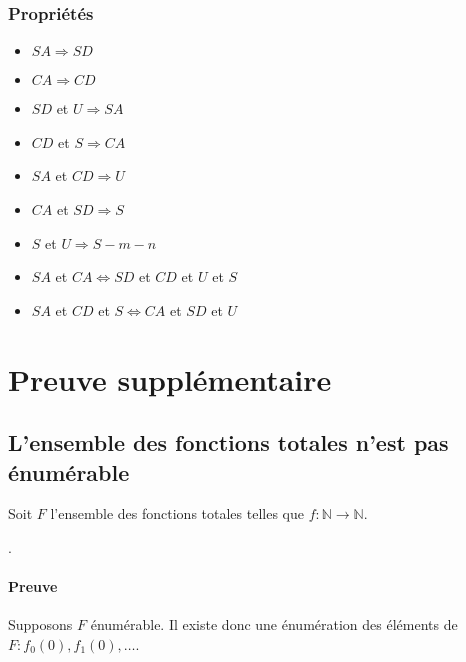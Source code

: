 \subsection{Propriétés}

\begin{itemize}
\item $SA \Rightarrow SD$
\item $CA \Rightarrow CD$
\item $SD$ et $U \Rightarrow SA$
\item $CD$ et $S \Rightarrow CA$
\item $SA$ et $CD \Rightarrow U$
\item $CA$ et $SD \Rightarrow S$
\item $S$ et $U \Rightarrow S-m-n$
\item $SA$ et $CA \Leftrightarrow SD$ et $CD$ et $U$ et $S$
\item $SA$ et $CD$ et $S \Leftrightarrow CA$ et $SD$ et $U$
\end{itemize}

\chapter{Preuve supplémentaire}

\section{L'ensemble des fonctions totales n'est pas énumérable}\label{sec:ensembleF}

Soit $F$ l'ensemble des fonctions totales telles que $f : \mathbb{N} \rightarrow \mathbb{N}$.

.

\subsubsection*{Preuve}

Supposons $F$ énumérable. Il existe donc une énumération des éléments de $F : f_0(0), f_1(0), \ldots$.

